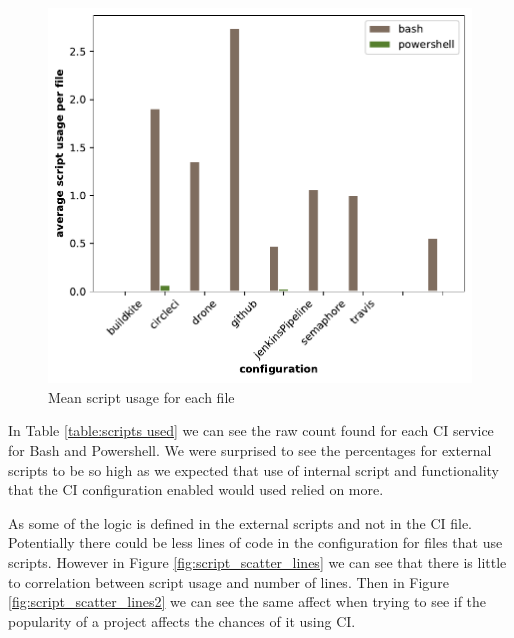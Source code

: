 \documentclass[10pt,conference]{IEEEtran}
\begin{document}
\begin{figure}[!ht]
  \includegraphics[width=\textwidth]{../src/results/scripts usage bars.pdf}
  \caption[alt text]{Mean script usage for each file}
  \label{fig:script_usage}  
\end{figure}



In Table \ref{table:scripts used} we can see the raw count found for each CI service for Bash and Powershell. We were surprised to see the percentages for external scripts to be so high as we expected that use of internal script and functionality that the CI configuration enabled would used relied on more.

\begin{table}
  
\end{table}

As some of the logic is defined in the external scripts and not in the CI file. Potentially there could be less lines of code in the configuration for files that use scripts. However in Figure \ref{fig:script_scatter_lines} we can see that there is little to correlation between script usage and number of lines. Then in Figure \ref{fig:script_scatter_lines2} we can see the same affect when trying to see if the popularity of a project affects the chances of it using CI.
\end{document}
